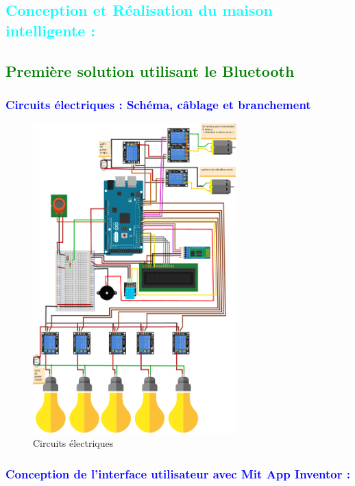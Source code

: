 \begin{flushleft}
	\section{\textcolor{cyan}{Conception et Réalisation du maison intelligente :}}
	\subsection{\textcolor{green}{Première solution utilisant le Bluetooth}}
	\subsubsection{\textcolor{blue}{Circuits électriques : Schéma, câblage et branchement}}
		\begin{figure}[h]
			\centering
			\includegraphics[width=0.7\textwidth]{chapitres/images/Simulation-Format-Fritzing_bb_bluetooth.png}
			\caption{Circuits électriques }
			\label{fig:labelname}
		\end{figure}
	\newpage
	\subsubsection{\textcolor{blue}{Conception de l'interface utilisateur avec Mit App Inventor :} }
					

\end{flushleft}
